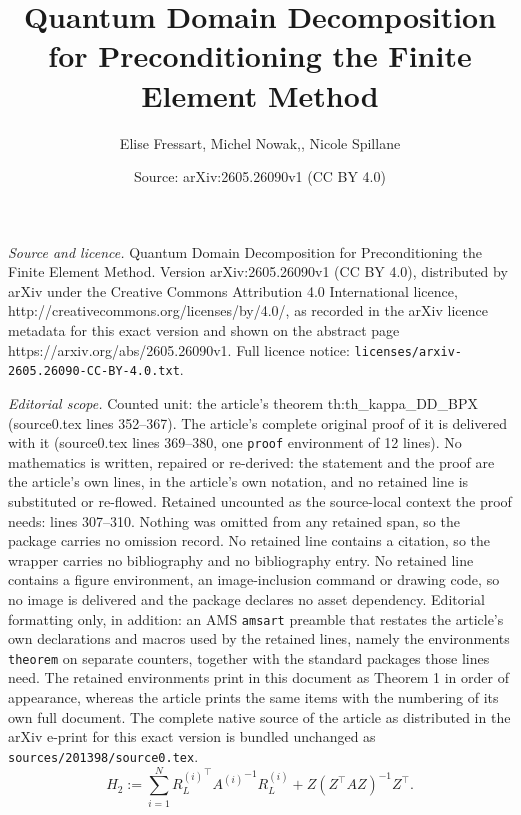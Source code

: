 \documentclass[10pt,a4paper]{amsart}
\title{Quantum Domain Decomposition for Preconditioning the Finite Element Method}
\author{Elise Fressart, Michel Nowak,, Nicole Spillane}
\date{Source: arXiv:2605.26090v1 (CC BY 4.0)}
\newcommand{\Htwo}{H_2}
\begin{document}
\maketitle

\noindent\emph{Source and licence.} Quantum Domain Decomposition for Preconditioning the Finite Element Method. Version arXiv:2605.26090v1 (CC BY 4.0), distributed by arXiv under the Creative Commons Attribution 4.0 International licence, http://creativecommons.org/licenses/by/4.0/, as recorded in the arXiv licence metadata for this exact version and shown on the abstract page https://arxiv.org/abs/2605.26090v1. Full licence notice: \texttt{licenses/arxiv-2605.26090-CC-BY-4.0.txt}.\par\smallskip

\noindent\textit{Editorial scope.} Counted unit: the article's theorem th:th\_kappa\_DD\_BPX (source0.tex lines 352--367). The article's complete original proof of it is delivered with it (source0.tex lines 369--380, one \texttt{proof} environment of 12 lines). No mathematics is written, repaired or re-derived: the statement and the proof are the article's own lines, in the article's own notation, and no retained line is substituted or re-flowed.  Retained uncounted as the source-local context the proof needs: lines 307--310.  Nothing was omitted from any retained span, so the package carries no omission record.  No retained line contains a citation, so the wrapper carries no bibliography and no bibliography entry.  No retained line contains a figure environment, an image-inclusion command or drawing code, so no image is delivered and the package declares no asset dependency.  Editorial formatting only, in addition: an AMS \texttt{amsart} preamble that restates the article's own declarations and macros used by the retained lines, namely the environments \texttt{theorem} on separate counters, together with the standard packages those lines need.  The retained environments print in this document as Theorem 1 in order of appearance, whereas the article prints the same items with the numbering of its own full document.  The complete native source of the article as distributed in the arXiv e-print for this exact version is bundled unchanged as \texttt{sources/201398/source0.tex}.
\begin{equation}
\label{eq:HASM2}
\Htwo := \sum_{i=1}^N {R_L^{(i)}}^\top {A^{(i)}}^{-1} R_L^{(i)} + Z (Z^\top A Z)^{-1} Z^\top.
\end{equation}
\end{document}
